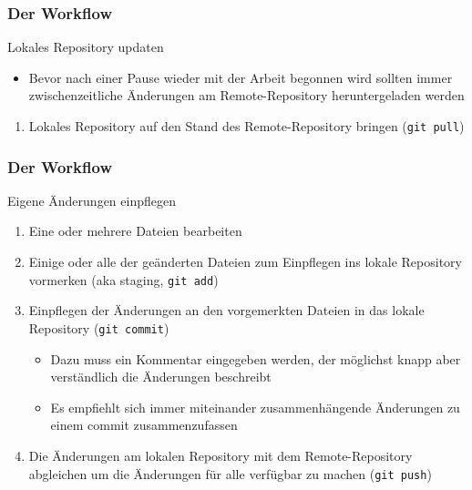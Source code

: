 \documentclass{beamer}
\begin{document}
\begin{frame}
  \frametitle{Der Workflow}

  \begin{block}{Lokales Repository updaten}
  \begin{itemize}
  \item Bevor nach einer Pause wieder mit der Arbeit begonnen wird sollten immer zwischenzeitliche Änderungen am Remote-Repository heruntergeladen werden
  \end{itemize}
  \begin{enumerate}
    \item Lokales Repository auf den Stand des Remote-Repository bringen (\texttt{git pull})
  \end{enumerate}
  \end{block}

\end{frame}


\begin{frame}
  \frametitle{Der Workflow}

  \begin{block}{Eigene Änderungen einpflegen}
  \begin{enumerate}
    \item Eine oder mehrere Dateien bearbeiten
    \item Einige oder alle der geänderten Dateien zum Einpflegen ins lokale Repository vormerken (aka staging, \texttt{git add})
    \item Einpflegen der Änderungen an den vorgemerkten Dateien in das lokale Repository (\texttt{git commit})
      \begin{itemize}
      \item Dazu muss ein Kommentar eingegeben werden, der möglichst knapp aber verständlich die Änderungen beschreibt
      \item Es empfiehlt sich immer miteinander zusammenhängende Änderungen zu einem commit zusammenzufassen
      \end{itemize}
    \item Die Änderungen am lokalen Repository mit dem Remote-Repository abgleichen um die Änderungen für alle verfügbar zu machen (\texttt{git push})
  \end{enumerate}
  \end{block}

\end{frame}
\end{document}
